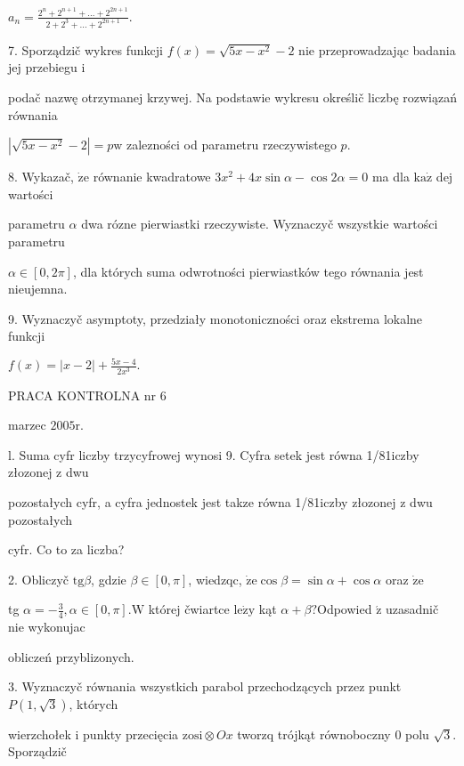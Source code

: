 \documentclass[a4paper,12pt]{article}
\begin{document}
$a_{n}=\displaystyle \frac{2^{n}+2^{n+1}+\ldots+2^{2n+1}}{2+2^{3}+\ldots+2^{2n+1}}.$

7. Sporządzič wykres funkcji $f(x)=\sqrt{5x-x^{2}}-2$ nie przeprowadzając badania jej przebiegu $\mathrm{i}$

podač nazwę otrzymanej krzywej. Na podstawie wykresu określič liczbę rozwiązań równania

$|\sqrt{5x-x^{2}}-2|=p\mathrm{w}$ zalezności od parametru rzeczywistego $p.$

8. Wykazač, $\dot{\mathrm{z}}\mathrm{e}$ równanie kwadratowe $ 3x^{2}+4x\sin\alpha-\cos 2\alpha = 0$ ma dla $\mathrm{k}\mathrm{a}\dot{\mathrm{z}}$ dej wartości

parametru $\alpha$ dwa rózne pierwiastki rzeczywiste. Wyznaczyč wszystkie wartości parametru

$\alpha\in[0,2\pi]$, dla których suma odwrotności pierwiastków tego równania jest nieujemna.

9. Wyznaczyč asymptoty, przedziały monotoniczności oraz ekstrema lokalne funkcji

$f(x)=|x-2|+\displaystyle \frac{5x-4}{2x^{3}}.$





PRACA KONTROLNA nr 6

marzec $2005\mathrm{r}.$

l. Suma cyfr liczby trzycyfrowej wynosi 9. Cyfra setek jest równa 1/81iczby złozonej $\mathrm{z}$ dwu

pozostałych cyfr, a cyfra jednostek jest takze równa 1/81iczby złozonej $\mathrm{z}$ dwu pozostałych

cyfr. Co to za liczba?

2. Obliczyč $\mathrm{t}\mathrm{g}\beta$, gdzie $\beta\in[0,\pi]$, wiedzqc, $\dot{\mathrm{z}}\mathrm{e}\cos\beta=\sin\alpha+\cos\alpha$ oraz $\dot{\mathrm{z}}\mathrm{e}$

tg $\displaystyle \alpha=-\frac{3}{4}, \alpha\in[0,\pi]. \mathrm{W}$ której čwiartce $\mathrm{l}\mathrm{e}\dot{\mathrm{z}}\mathrm{y}$ kąt $\alpha+\beta?$Odpowied $\acute{\mathrm{z}}$ uzasadnič nie wykonujac

obliczeń przyblizonych.

3. Wyznaczyč równania wszystkich parabol przechodzących przez punkt $P(1,\sqrt{3})$, których

wierzchołek $\mathrm{i}$ punkty przecięcia $\mathrm{z}\mathrm{o}\mathrm{s}\mathrm{i}\otimes Ox$ tworzq trójkąt równoboczny $0$ polu $\sqrt{3}$. Sporządzič
\end{document}

